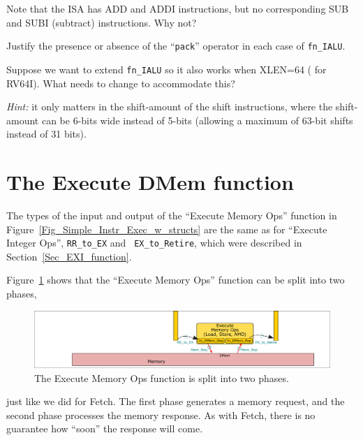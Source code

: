 \Exercise

Note that the ISA has ADD and ADDI instructions, but no corresponding
SUB and SUBI (subtract) instructions.  Why not?

\Exercise

Justify the presence or absence of the ``{\tt pack}'' operator in each
case of {\tt fn\_IALU}.

\Exercise

Suppose we want to extend {\tt fn\_IALU} so it also works when XLEN=64
({\ie} for RV64I).  What needs to change to accommodate this?

\emph{Hint:} it only matters in the shift-amount of the shift
instructions, where the shift-amount can be 6-bits wide instead of
5-bits (allowing a maximum of 63-bit shifts instead of 31 bits).

\Endexercise


\section{The Execute DMem function}

\label{Sec_DMem_function}


The types of the input and output of the ``Execute Memory Ops''
function in Figure~\ref{Fig_Simple_Instr_Exec_w_structs} are the same
as for ``Execute Integer Ops'', {\ie} {\tt RR\_to\_EX} and {\tt
EX\_to\_Retire}, which were described in Section~\ref{Sec_EXI_function}.

Figure~\ref{Fig_fn_DMem} shows that the ``Execute Memory Ops''
function can be split into two phases,
\begin{figure}[htbp]
  \centerline{\includegraphics[width=6in,angle=0]{ch060/Figures/Fig_fn_DMem}}
  \caption{\label{Fig_fn_DMem}The Execute Memory Ops function is split into two phases.}
\end{figure}
just like we did for Fetch.  The first phase generates a memory
request, and the second phase processes the memory response.  As with
Fetch, there is no guarantee how ``soon'' the response will come.

